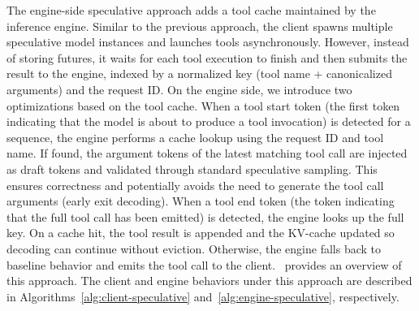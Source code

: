 The engine-side speculative approach adds a tool cache maintained by the inference engine. Similar to the previous approach, the client spawns multiple speculative model instances and launches tools asynchronously. However, instead of storing futures, it waits for each tool execution to finish and then submits the result to the engine, indexed by a normalized key (tool name + canonicalized arguments) and the request ID. On the engine side, we introduce two optimizations based on the tool cache. When a tool start token (the first token indicating that the model is about to produce a tool invocation) is detected for a sequence, the engine performs a cache lookup using the request ID and tool name.  
If found, the argument tokens of the latest matching tool call are injected as draft tokens and validated through standard speculative sampling. This ensures correctness and potentially avoids the need to generate the tool call arguments (early exit decoding). When a tool end token (the token indicating that the full tool call has been emitted) is detected, the engine looks up the full key. On a cache hit, the tool result is appended and the KV-cache updated so decoding can continue without eviction. Otherwise, the engine falls back to baseline behavior and emits the tool call to the client.~ provides an overview of this approach. The client and engine behaviors under this approach are described in Algorithms~\ref{alg:client-speculative} and~\ref{alg:engine-speculative}, respectively.

